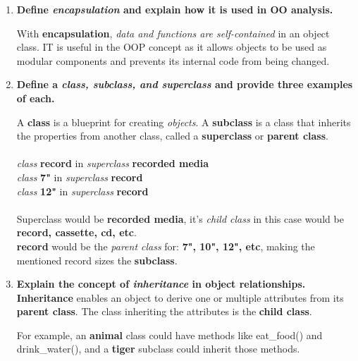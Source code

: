 \documentclass{article}
\begin{document}
\begin{enumerate}
  \item \textbf{Define \textit{encapsulation} and explain how it is used in OO analysis.}

    With \textbf{encapsulation}, \textit{data and functions are self-contained} in an object class.
    IT is useful in the OOP concept as it allows objects to be used as modular components
    and prevents its internal code from being changed.

  \item \textbf{Define a \textit{class, subclass, and superclass} and provide three examples of each.}

  A \textbf{class} is a blueprint for creating \textit{objects}. A \textbf{subclass} is a class that
    inherits the properties from another class, called a \textbf{superclass} or \textbf{parent class}.
    \\ \\
    \textit{class} \textbf{record} in \textit{superclass} \textbf{recorded media} \\
    \textit{class} \textbf{7"} in \textit{superclass} \textbf{record} \\
    \textit{class} \textbf{12"} in \textit{superclass} \textbf{record} \\ \\
    
    Superclass would be \textbf{recorded media}, it's \textit{child class} in this case would be
    \textbf{record, cassette, cd, etc}. \\

    \textbf{record} would be the \textit{parent class} for: \textbf{7", 10", 12", etc}, making the
    mentioned record sizes the \textbf{subclass}.

  \item \textbf{Explain the concept of \textit{inheritance} in object relationships.}
    \textbf{Inheritance} enables an object to derive one or multiple attributes from its \textbf{parent class}.
    The class inheriting the attributes is the \textbf{child class}.

    For example, an \textbf{animal} class could have methods like eat\_food() and drink\_water(), and a 
    \textbf{tiger} subclass could inherit those methods.


\end{enumerate}
\end{document}

